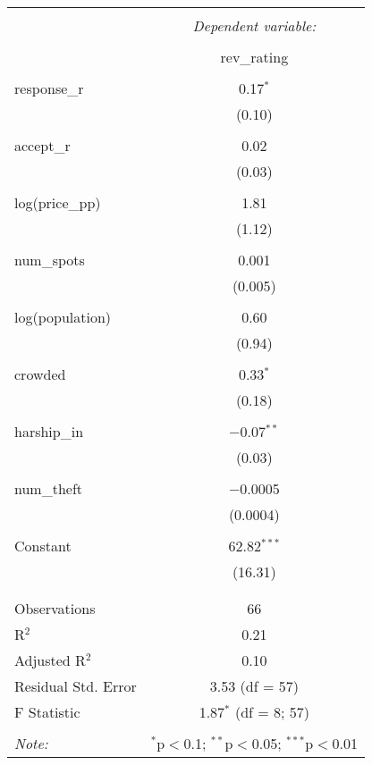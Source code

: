 
\begin{table}[!htbp] \centering 
  \caption{} 
  \label{} 
\begin{tabular}{@{\extracolsep{5pt}}lc} 
\\[-1.8ex]\hline 
\hline \\[-1.8ex] 
 & \multicolumn{1}{c}{\textit{Dependent variable:}} \\ 
\cline{2-2} 
\\[-1.8ex] & rev\_rating \\ 
\hline \\[-1.8ex] 
 response\_r & 0.17$^{*}$ \\ 
  & (0.10) \\ 
  & \\ 
 accept\_r & 0.02 \\ 
  & (0.03) \\ 
  & \\ 
 log(price\_pp) & 1.81 \\ 
  & (1.12) \\ 
  & \\ 
 num\_spots & 0.001 \\ 
  & (0.005) \\ 
  & \\ 
 log(population) & 0.60 \\ 
  & (0.94) \\ 
  & \\ 
 crowded & 0.33$^{*}$ \\ 
  & (0.18) \\ 
  & \\ 
 harship\_in & $-$0.07$^{**}$ \\ 
  & (0.03) \\ 
  & \\ 
 num\_theft & $-$0.0005 \\ 
  & (0.0004) \\ 
  & \\ 
 Constant & 62.82$^{***}$ \\ 
  & (16.31) \\ 
  & \\ 
\hline \\[-1.8ex] 
Observations & 66 \\ 
R$^{2}$ & 0.21 \\ 
Adjusted R$^{2}$ & 0.10 \\ 
Residual Std. Error & 3.53 (df = 57) \\ 
F Statistic & 1.87$^{*}$ (df = 8; 57) \\ 
\hline 
\hline \\[-1.8ex] 
\textit{Note:}  & \multicolumn{1}{r}{$^{*}$p$<$0.1; $^{**}$p$<$0.05; $^{***}$p$<$0.01} \\ 
\end{tabular} 
\end{table} 
